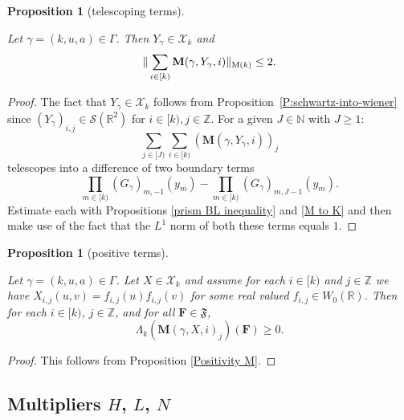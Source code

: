 \documentclass[12pt,reqno]{amsart}
\theoremstyle{plain}
\newtheorem{proposition}[theorem]{Proposition}
\numberwithin{equation}{section}
\theoremstyle{remark}
\newcommand{\uses}[1]{}
\newcommand{\usesdefs}[1]{}
\newcommand{\leanok}{}
\newcommand{\lean}[1]{}
\newcommand{\Z}{{\mathbb Z}}
\newcommand{\R}{{\mathbb R}}
\newcommand{\N}{{\mathbb N}}
\newcommand{\M}{\mathbf{M}}
\newcommand{\F}{\mathbf{F}}
\begin{document}
\begin{proposition}[telescoping terms]\label{telescoping terms}\uses{P:schwartz-into-wiener,prism BL inequality,M to K}\usesdefs{geometric parameters,double sequence of 2D functions,kernel sequences,2D Gaussians,sandwich kernel,auto:Gaussian-difference-kernel-definition}
\lean{Auto.telescopingTerms}
\leanok
Let $\gamma=(k,u,a)\in \Gamma$.
Then $Y_\gamma\in \mathcal{X}_k$ and
\begin{equation}\label{auto:telescoping-terms-bound}
    \|\sum_{i\in [k)} \M(\gamma,Y_\gamma,i)\|_{{\rm M}(k)}\le 2.
\end{equation}
\end{proposition}

\begin{proof}
The fact that $Y_\gamma\in \mathcal{X}_k$ follows from Proposition~\ref{P:schwartz-into-wiener} since $(Y_\gamma)_{i,j}\in \mathcal S(\R^2)$ for $i\in [k), j\in \Z$.
For a given $J\in\N$ with $J\ge1$:
\[
\sum_{j\in [J)} \sum_{i\in [k)} (\M(\gamma,Y_\gamma,i))_j
\]
telescopes into a difference of two boundary terms
\[
\prod_{m\in [k)} (G_{\gamma})_{m,-1}(y_m) -\prod_{m\in [k)} (G_{\gamma})_{m,J-1}(y_m).
\]
Estimate each with Propositions \ref{prism BL inequality} and \ref{M to K} and then make use of the fact that the $L^1$ norm of both these terms equals $1$.
\end{proof}


\begin{proposition}[positive terms]\label{positive terms}\uses{Positivity M}\usesdefs{auto:Wiener-space-definition,normalized function tuples,auto:prism-form-definition,geometric parameters,double sequence of 2D functions,sandwich kernel}
\lean{Auto.positiveTerms}
\leanok
Let $\gamma=(k,u,a)\in \Gamma$. Let $X\in \mathcal{X}_k$ and assume for each $i\in [k)$ and  $j\in \Z$ we have
 $X_{i,j}(u,v)=f_{i,j}(u)f_{i,j}(v)$ for some real valued $f_{i,j}\in W_0(\R)$.
Then for each $i\in [k)$, $j\in\Z$, and for all $\F\in {\mathfrak{F}}$,
\begin{equation}\label{E:form-nonnegative}
    \Lambda_k(\M(\gamma,X,i)_j)(\mathbf{F})\ge 0.
\end{equation}
\end{proposition}

\begin{proof}
This follows from Proposition \ref{Positivity M}.
\end{proof}

\subsection{\texorpdfstring{Multipliers $H$, $L$, $N$}{Multipliers H, L, N}}
\end{document}
